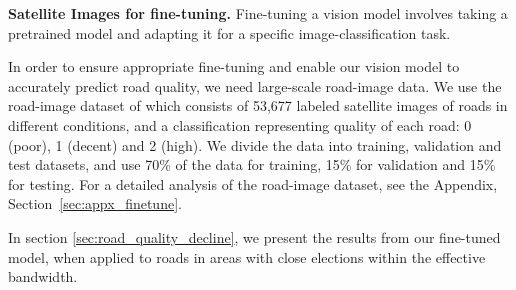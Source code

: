 {\bf Satellite Images for fine-tuning.} Fine-tuning a vision model involves taking a pretrained model and adapting it for a specific image-classification task.

In order to ensure appropriate fine-tuning and enable our vision model to accurately predict road quality, we need large-scale road-image data. We use the road-image dataset of \cite{brewer2021} which consists of 53,677 labeled satellite images of roads in different conditions, and a classification representing quality of each road: 0 (poor), 1 (decent) and 2 (high). We divide the data into training, validation and test datasets, and use 70\% of the data for training, 15\% for validation and 15\% for testing.
For a detailed analysis of the road-image dataset, see the Appendix, Section~\ref{sec:appx_finetune}.

In section \ref{sec:road_quality_decline}, we present the results from our fine-tuned model, when applied to roads in areas with close elections within the effective bandwidth.


